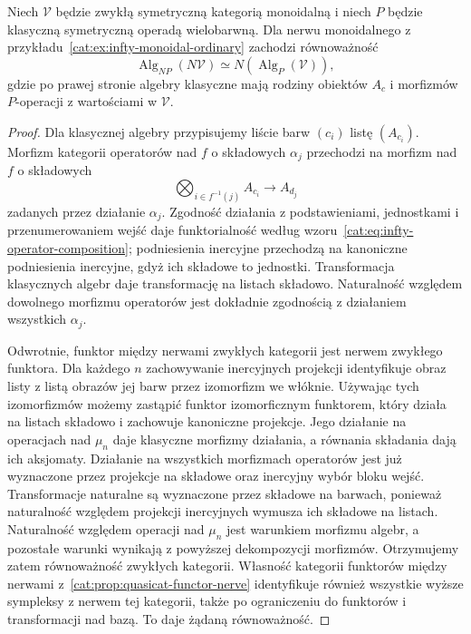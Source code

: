 \begin{przyklad}\label{cat:ex:infty-algebra-ordinary}
Niech $\mathcal V$ będzie zwykłą symetryczną kategorią monoidalną i niech $P$ będzie klasyczną symetryczną operadą wielobarwną. Dla nerwu monoidalnego z przykładu~\ref{cat:ex:infty-monoidal-ordinary} zachodzi równoważność
\[
 \operatorname{Alg}_{NP}(N\mathcal V)
 \simeq N(\operatorname{Alg}_{P}(\mathcal V)),
\]
gdzie po prawej stronie algebry klasyczne mają rodziny obiektów $A_c$ i morfizmów $P$-operacji z wartościami w $\mathcal V$.
\end{przyklad}
\begin{proof}
Dla klasycznej algebry przypisujemy liście barw $(c_i)$ listę $(A_{c_i})$. Morfizm kategorii operatorów nad $f$ o składowych $\alpha_j$ przechodzi na morfizm nad $f$ o składowych
\[
 \bigotimes_{i\in f^{-1}(j)} A_{c_i}
 \longrightarrow A_{d_j}
\]
zadanych przez działanie $\alpha_j$. Zgodność działania z podstawieniami, jednostkami i przenumerowaniem wejść daje funktorialność według wzoru~\eqref{cat:eq:infty-operator-composition}; podniesienia inercyjne przechodzą na kanoniczne podniesienia inercyjne, gdyż ich składowe to jednostki. Transformacja klasycznych algebr daje transformację na listach składowo. Naturalność względem dowolnego morfizmu operatorów jest dokładnie zgodnością z działaniem wszystkich $\alpha_j$.

Odwrotnie, funktor między nerwami zwykłych kategorii jest nerwem zwykłego funktora. Dla każdego $n$ zachowywanie inercyjnych projekcji identyfikuje obraz listy z listą obrazów jej barw przez izomorfizm we włóknie. Używając tych izomorfizmów możemy zastąpić funktor izomorficznym funktorem, który działa na listach składowo i zachowuje kanoniczne projekcje. Jego działanie na operacjach nad $\mu_n$ daje klasyczne morfizmy działania, a równania składania dają ich aksjomaty. Działanie na wszystkich morfizmach operatorów jest już wyznaczone przez projekcje na składowe oraz inercyjny wybór bloku wejść. Transformacje naturalne są wyznaczone przez składowe na barwach, ponieważ naturalność względem projekcji inercyjnych wymusza ich składowe na listach. Naturalność względem operacji nad $\mu_n$ jest warunkiem morfizmu algebr, a pozostałe warunki wynikają z powyższej dekompozycji morfizmów. Otrzymujemy zatem równoważność zwykłych kategorii. Własność kategorii funktorów między nerwami z~\ref{cat:prop:quasicat-functor-nerve} identyfikuje również wszystkie wyższe sympleksy z nerwem tej kategorii, także po ograniczeniu do funktorów i transformacji nad bazą. To daje żądaną równoważność.
\end{proof}

